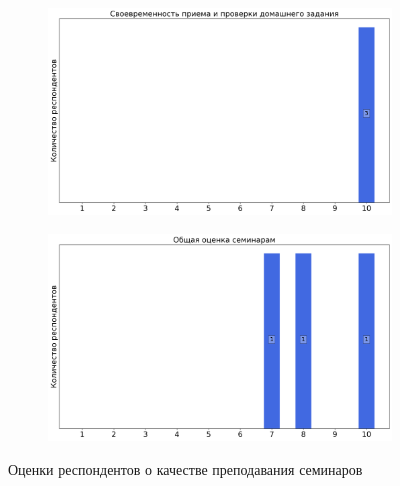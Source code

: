 \begin{figure}[H]
\begin{subfigure}[b]{0.45\textwidth}
				\includegraphics[width=\textwidth]{images/2 course/Общая физика - электричество и магнетизм/seminarists-marks-Овчинкин В.А.-2.png}
			\end{subfigure}
			\begin{subfigure}[b]{0.45\textwidth}
				\centering
				\includegraphics[width=\textwidth]{images/2 course/Общая физика - электричество и магнетизм/seminarists-marks-Овчинкин В.А.-3.png}
			\end{subfigure}	
			\caption{Оценки респондентов о качестве преподавания семинаров}
		\end{figure}


